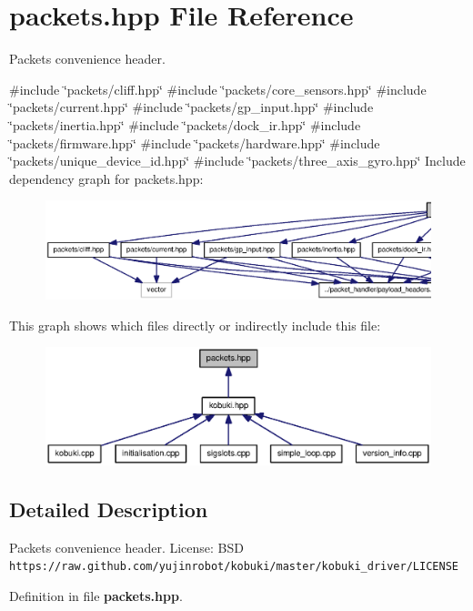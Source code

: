 \section{packets.\-hpp \-File \-Reference}
\label{packets_8hpp}


\-Packets convenience header.  


{\ttfamily \#include \char`\"{}packets/cliff.\-hpp\char`\"{}}\*
{\ttfamily \#include \char`\"{}packets/core\-\_\-sensors.\-hpp\char`\"{}}\*
{\ttfamily \#include \char`\"{}packets/current.\-hpp\char`\"{}}\*
{\ttfamily \#include \char`\"{}packets/gp\-\_\-input.\-hpp\char`\"{}}\*
{\ttfamily \#include \char`\"{}packets/inertia.\-hpp\char`\"{}}\*
{\ttfamily \#include \char`\"{}packets/dock\-\_\-ir.\-hpp\char`\"{}}\*
{\ttfamily \#include \char`\"{}packets/firmware.\-hpp\char`\"{}}\*
{\ttfamily \#include \char`\"{}packets/hardware.\-hpp\char`\"{}}\*
{\ttfamily \#include \char`\"{}packets/unique\-\_\-device\-\_\-id.\-hpp\char`\"{}}\*
{\ttfamily \#include \char`\"{}packets/three\-\_\-axis\-\_\-gyro.\-hpp\char`\"{}}\*
\-Include dependency graph for packets.\-hpp\-:
\nopagebreak
\begin{figure}[H]
\begin{center}
\leavevmode
\includegraphics[width=350pt]{packets_8hpp__incl}
\end{center}
\end{figure}
\-This graph shows which files directly or indirectly include this file\-:
\nopagebreak
\begin{figure}[H]
\begin{center}
\leavevmode
\includegraphics[width=350pt]{packets_8hpp__dep__incl}
\end{center}
\end{figure}


\subsection{\-Detailed \-Description}
\-Packets convenience header. \-License\-: \-B\-S\-D {\tt https\-://raw.\-github.\-com/yujinrobot/kobuki/master/kobuki\-\_\-driver/\-L\-I\-C\-E\-N\-S\-E} 

\-Definition in file {\bf packets.\-hpp}.

